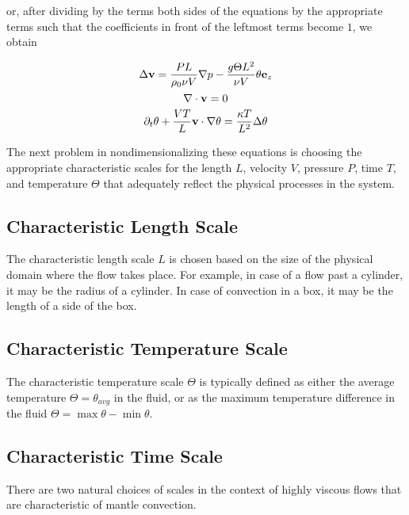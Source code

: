 or, after dividing by the terms both sides of the equations by the appropriate terms such that the coefficients in front of the leftmost terms become $1$, we obtain

\begin{equation} \label{stokes1_pre_nondim}
\Delta\mathbf{v} = \frac{P L}{\rho_0 \nu V}\nabla p - \frac{g \Theta L^2}{\nu V} \theta \mathbf{e}_z
\end{equation}
\begin{equation} \label{stokes2_pre_nondim}
\nabla\cdot \mathbf{v} = 0
\end{equation}
\begin{equation} \label{heat_eq_pre_nondim}
\partial_t\theta + \frac{VT}{L} \mathbf{v}\cdot\nabla\theta = \frac{\kappa T}{L^2} \Delta\theta  
\end{equation} 

The next problem in nondimensionalizing these equations is choosing the appropriate characteristic scales for the length $L$, velocity $V$, pressure $P$, time $T$, and temperature $\Theta$ that adequately reflect the physical processes in the system. 

\subsection{Characteristic Length Scale}

The characteristic length scale $L$ is chosen based on the size of the physical domain where the flow takes place. For example, in case of a flow past a cylinder, it may be the radius of a cylinder. In case of convection in a box, it may be the length of a side of the box.

\subsection{Characteristic Temperature Scale}

The characteristic temperature scale $\Theta$ is typically defined as either the average temperature $\Theta = \theta_{avg}$ in the fluid, or as the maximum temperature difference in the fluid $\Theta = \max \theta - \min \theta$.

\subsection{Characteristic Time Scale}

There are two natural choices of scales in the context of highly viscous flows that are characteristic of mantle convection. \cite[pp. 19-20]{getling}

